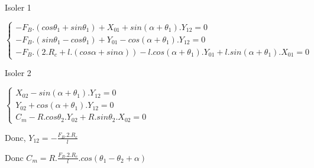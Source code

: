 Isoler 1

$\left\{\begin{array}{l}
-F_B.(cos\theta_1+sin\theta_1)+X_{01}+sin(\alpha+\theta_1).Y_{12}=0 \\
-F_B.(sin\theta_1-cos\theta_1)+Y_{01}-cos(\alpha+\theta_1).Y_{12}=0 \\
-F_B.(2.R_c+l.(cos\alpha+sin\alpha))-l.cos(\alpha+\theta_1).Y_{01}+l.sin(\alpha+\theta_1).X_{01}=0
\end{array}\right.$

Isoler 2

$\left\{\begin{array}{l}
X_{02}-sin(\alpha+\theta_1).Y_{12}=0 \\
Y_{02}+cos(\alpha+\theta_1).Y_{12}=0 \\
C_m-R.cos\theta_2.Y_{02}+R.sin\theta_2.X_{02}=0
\end{array}\right.$

Donc, $Y_{12}=-\frac{F_B.2.R_c}{l}$

Donc $C_m=R.\frac{F_B.2.R_c}{l}.cos(\theta_1-\theta_2+\alpha)$


